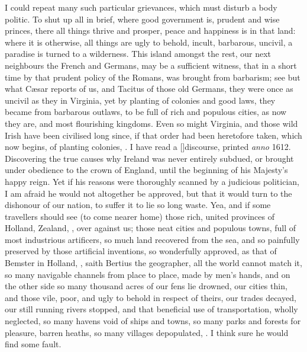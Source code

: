 {I could repeat many such particular grievances, which must disturb a
body politic. To shut up all in brief, where good government is,
prudent and wise princes, there all things thrive and prosper, peace
and happiness is in that land: where it is otherwise, all things are
ugly to behold, incult, barbarous, uncivil, a paradise is turned to a
wilderness. This island amongst the rest, our next neighbours the
French and Germans, may be a sufficient witness, that in a short time
by that prudent policy of the Romans, was brought from barbarism; see
but what C\ae{}sar reports of us, and Tacitus of those old Germans, they
were once as uncivil as they in Virginia, yet by planting of colonies
and good laws, they became from barbarous outlaws, to be full of
rich and populous cities, as now they are, and most flourishing
kingdoms. Even so might Virginia, and those wild Irish have been
civilised long since, if that order had been heretofore taken, which
now begins, of planting colonies, \etc{}. I have read a [\baselineskip]discourse,
printed \emph{anno} 1612. Discovering the true causes why Ireland was never
entirely subdued, or brought under obedience to the crown of England,
until the beginning of his Majesty's happy reign. Yet if his reasons
were thoroughly scanned by a judicious politician, I am afraid he would
not altogether be approved, but that it would turn to the dishonour of
our nation, to suffer it to lie so long waste. Yea, and if some
travellers should see (to come nearer home) those rich, united
provinces of Holland, Zealand, \etc{}, over against us; those neat cities
and populous towns, full of most industrious artificers, so much
land recovered from the sea, and so painfully preserved by those
artificial inventions, so wonderfully approved, as that of Bemster in
Holland, , saith
Bertius the geographer, all the world cannot match it, so many
navigable channels from place to place, made by men's hands, \etc{} and on
the other side so many thousand acres of our fens lie drowned, our
cities thin, and those vile, poor, and ugly to behold in respect of
theirs, our trades decayed, our still running rivers stopped, and that
beneficial use of transportation, wholly neglected, so many havens void
of ships and towns, so many parks and forests for pleasure, barren
heaths, so many villages depopulated, \etc{}. I think sure he would find
some fault.

}
